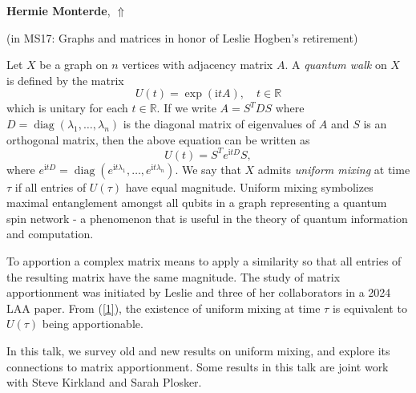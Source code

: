 \documentclass[ILAS2025-program.tex]{subfiles}
\begin{document}
\hypertarget{down0180}{}\begin{ilasabstract}
    
\textbf{Hermie Monterde},  \hfill \hyperlink{up0180}{$\Uparrow$}
    
    
(in {\color{mstitle}MS17: Graphs and matrices in honor of Leslie Hogben's retirement})
        
\mtskip
    Let $X$ be a graph on $n$ vertices with adjacency matrix $A$. A \textit{quantum walk} on $X$ is defined by the matrix
\begin{equation*}
U(t)=\exp({\mathrm{i}tA}),\quad t\in\mathbb{R}
\end{equation*}
which is unitary for each $t\in\mathbb{R}$. If we write $A=S^TDS$ where $D=\operatorname{diag}(\lambda_1,\ldots,\lambda_n)$ is the diagonal matrix of eigenvalues of $A$ and $S$ is an orthogonal matrix, then the above equation can be written as
\begin{equation}
\label{1}
U(t)=S^Te^{\mathrm{i}tD}S,
\end{equation}
where $e^{\mathrm{i}tD}=\operatorname{diag}(e^{\mathrm{i}t\lambda_1},\ldots,e^{\mathrm{i}t\lambda_n})$. We say that $X$ admits \textit{uniform mixing} at time $\tau$ if all entries of $U(\tau)$ have equal magnitude. Uniform mixing symbolizes maximal entanglement amongst all qubits in a graph representing a quantum spin network - a phenomenon that is useful in the theory of quantum information and computation.

To apportion a complex matrix means to apply a similarity so that all entries of the resulting matrix have the same magnitude. The study of matrix apportionment was initiated by Leslie and three of her collaborators in a 2024 LAA paper. From (\ref{1}), the existence of uniform mixing at time $\tau$ is equivalent to $U(\tau)$ being apportionable.  

In this talk, we survey old and new results on uniform mixing, and explore its connections to matrix apportionment. Some results in this talk are joint work with Steve Kirkland and Sarah Plosker.

\end{ilasabstract}
    
\end{document}
